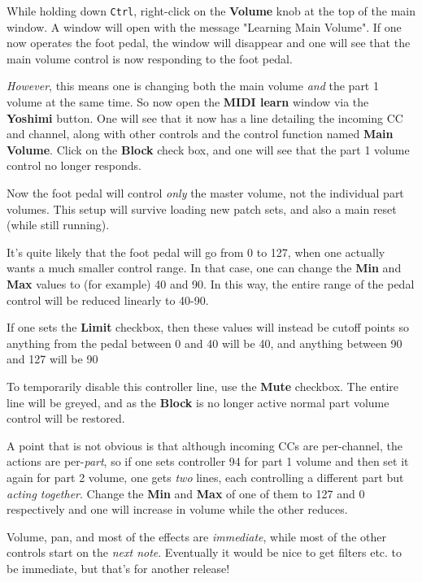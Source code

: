    While holding down \texttt{Ctrl}, right-click on the
   \textbf{Volume} knob at the top of the
   main window. A window will open with the message "Learning Main Volume".
   If one now operates the foot pedal, the window will disappear and one will
   see that the main volume control is now responding to the foot pedal.

   \textsl{However}, this means one is changing both the main volume
   \textsl{and} the part 1 volume at the same time.  So now open the
   \textbf{MIDI learn} window via the \textbf{Yoshimi} button. One will
   see that it now has a line detailing the incoming CC and channel, along with
   other controls and the control function named \textbf{Main Volume}.  Click
   on the \textbf{Block} check box, and one will see that the part 1 volume
   control no longer responds.

   Now the foot pedal will control \textsl{only} the master volume, not the
   individual part volumes. This setup will survive loading new patch sets, and
   also a main reset (while still running).

   It's quite likely that the foot pedal will go from 0 to 127, when one actually
   wants a much smaller control range.  In that case, one can change the
   \textbf{Min} and \textbf{Max}
   values to (for example) 40 and 90.
   In this way, the entire range of the pedal control will be reduced linearly to
   40-90.

   If one sets the \textbf{Limit} checkbox, then these values will instead be
   cutoff points so anything from the pedal between 0 and 40 will be 40, and
   anything between 90 and 127 will be 90

   To temporarily disable this controller line, use the \textbf{Mute} checkbox.
   The entire line will be greyed, and as the \textbf{Block} is no longer
   active normal part volume control will be restored.

   A point that is not obvious is that although incoming CCs are per-channel,
   the actions are per-\textsl{part}, so if one sets controller 94 for part 1
   volume and then set it again for part 2 volume, one gets \textsl{two} lines,
   each controlling a different part but \textsl{acting together}.  Change the
   \textbf{Min} and \textbf{Max} of one of them to 127 and 0 respectively and
   one will increase in volume while the other reduces.

   Volume, pan, and most of the effects are \textsl{immediate}, while most of
   the other controls start on the \textsl{next note}.  Eventually it would be
   nice to get filters etc. to be immediate, but that's for another release!

